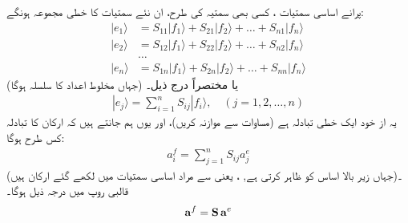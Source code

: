   پرانے اساسی سمتیات ،  کسی بھی سمتیہ کی طرح،  ان نئے سمتیات  کا خطی مجموعہ ہونگے:
\begin{align*}
	|e_1\rangle &= S_{11}|f_1\rangle + S_{21}|f_2\rangle + \dots + S_{n1}|f_n\rangle\\
	|e_2\rangle &= S_{12}|f_1\rangle + S_{22}|f_2\rangle +
	\dots + S_{n2}|f_n\rangle\\
	&\dots\\
	|e_n\rangle &= S_{1n}|f_1\rangle + S_{2n}|f_2\rangle + \dots + S_{nn}|f_n\rangle
\end{align*}
(جہاں  مخلوط اعداد کا سلسلہ ہوگا)  یا مختصراً درج  ذیل۔
\begin{align}
	|e_{j}\rangle = \sum_{i=1}^{n}S_{ij}|f_i\rangle,\quad(j=1, 2, \dots, n)
\end{align}
یہ از خود ایک خطی تبادلہ ہے  (مساوات    سے موازنہ کریں)،   اور یوں  ہم جانتے ہیں کہ ارکان کا تبادلہ کس طرح ہوگا:
\begin{align}
	a_i^f = \sum_{j=1}^{n}S_{ij}a_j^e
\end{align}
(جہاں زیر بالا  اساس کو ظاہر کرتی ہے, ، یعنی  سے مراد اساسی سمتیات  میں لکھے گئے ارکان ہیں)۔ قالبی روپ میں درجہ ذیل ہوگا۔
\begin{align}\label{مساوات_ضمیمہ_پرانا_اساس}
	\operatorname{\mathbf{a}}^f = \operatorname{\mathbf{S}}\operatorname{\mathbf{a}}^e
\end{align}

